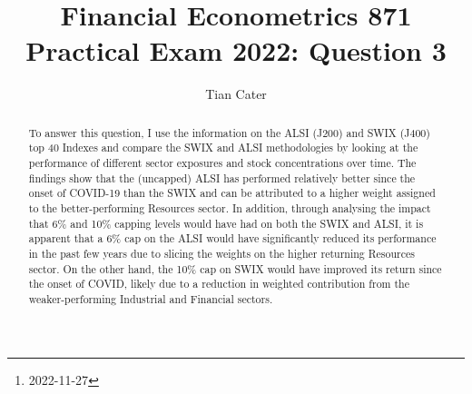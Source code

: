 \documentclass[11pt,preprint, authoryear]{elsarticle}
\numberwithin{equation}{section}
\numberwithin{figure}{section}
\numberwithin{table}{section}
\let\rmarkdownfootnote\footnote%
\def\footnote{\protect\rmarkdownfootnote}
\begin{document}
\begin{frontmatter}  %

\title{Financial Econometrics 871 Practical Exam 2022: Question 3}





\author[Add1]{Tian Cater}





\address[Add1]{University of Stellenbosch, Western Cape, South
Africa\footnote{2022-11-27}}


\begin{abstract}
\small{
To answer this question, I use the information on the ALSI (J200) and
SWIX (J400) top 40 Indexes and compare the SWIX and ALSI methodologies
by looking at the performance of different sector exposures and stock
concentrations over time. The findings show that the (uncapped) ALSI has
performed relatively better since the onset of COVID-19 than the SWIX
and can be attributed to a higher weight assigned to the
better-performing Resources sector. In addition, through analysing the
impact that 6\% and 10\% capping levels would have had on both the SWIX
and ALSI, it is apparent that a 6\% cap on the ALSI would have
significantly reduced its performance in the past few years due to
slicing the weights on the higher returning Resources sector. On the
other hand, the 10\% cap on SWIX would have improved its return since
the onset of COVID, likely due to a reduction in weighted contribution
from the weaker-performing Industrial and Financial sectors.
}
\end{abstract}

\vspace{1cm}





\vspace{0.5cm}

\end{frontmatter}



\pagestyle{fancy}
\chead{}
\lfoot{}
\lhead{}
\cfoot{}

\end{document}

